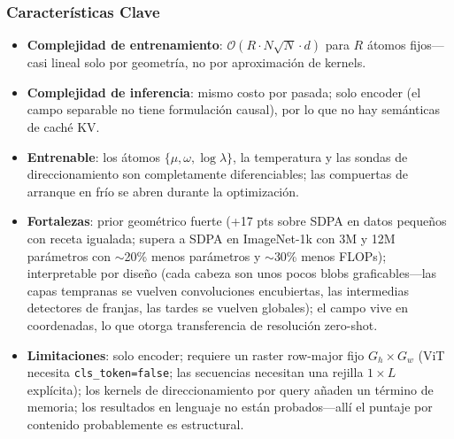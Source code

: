 \subsubsection{Características Clave}
\begin{itemize}[leftmargin=*]
    \item \textbf{Complejidad de entrenamiento}: $\mathcal{O}(R \cdot N \sqrt{N} \cdot d)$ para $R$ átomos fijos---casi lineal solo por geometría, no por aproximación de kernels.
    \item \textbf{Complejidad de inferencia}: mismo costo por pasada; solo encoder (el campo separable no tiene formulación causal), por lo que no hay semánticas de caché KV.
    \item \textbf{Entrenable}: los átomos $\{\mu, \omega, \log\lambda\}$, la temperatura y las sondas de direccionamiento son completamente diferenciables; las compuertas de arranque en frío se abren durante la optimización.
    \item \textbf{Fortalezas}: prior geométrico fuerte (+17 pts sobre SDPA en datos pequeños con receta igualada; supera a SDPA en ImageNet-1k con 3M y 12M parámetros con $\sim$20\% menos parámetros y $\sim$30\% menos FLOPs); interpretable por diseño (cada cabeza son unos pocos blobs graficables---las capas tempranas se vuelven convoluciones encubiertas, las intermedias detectores de franjas, las tardes se vuelven globales); el campo vive en coordenadas, lo que otorga transferencia de resolución zero-shot.
    \item \textbf{Limitaciones}: solo encoder; requiere un raster row-major fijo $G_h \times G_w$ (ViT necesita \texttt{cls\_token=false}; las secuencias necesitan una rejilla $1 \times L$ explícita); los kernels de direccionamiento por query añaden un término de memoria; los resultados en lenguaje no están probados---allí el puntaje por contenido probablemente es estructural.
\end{itemize}
